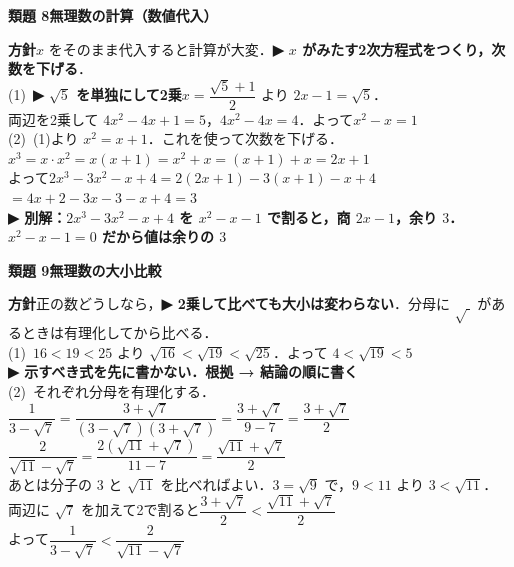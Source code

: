 \documentclass[a4paper,11pt]{ltjsarticle}
\newcommand{\ans}[2]{\Needspace{5\baselineskip}\vspace{6pt}%
  {\sffamily\bfseries 類題 #1\quad #2}\par}
\newcommand{\point}[1]{\textsf{\bfseries ▶ #1}}
\begin{document}
\ans{8}{無理数の計算（数値代入）}
\begin{kai}
\textbf{方針}\quad $x$ をそのまま代入すると計算が大変．\point{$x$ がみたす2次方程式をつくり，次数を下げる}．\\[2pt]
(1)\ \point{$\sqrt5$ を単独にして2乗}\quad $x=\dfrac{\sqrt5+1}{2}$ より $2x-1=\sqrt5$．\\
\hspace*{1.5em}両辺を2乗して $4x^2-4x+1=5$，\quad $4x^2-4x=4$．\quad よって\quad $x^2-x=1$\\[2pt]
(2)\ (1)より $x^2=x+1$．これを使って次数を下げる．\\
\hspace*{1.5em}$x^3=x\cdot x^2=x(x+1)=x^2+x=(x+1)+x=2x+1$\\
\hspace*{1.5em}よって\quad $2x^3-3x^2-x+4=2(2x+1)-3(x+1)-x+4$\\
\hspace*{1.5em}$=4x+2-3x-3-x+4=3$\\
\hspace*{1.5em}\point{別解：$2x^3-3x^2-x+4$ を $x^2-x-1$ で割ると，商 $2x-1$，余り $3$．$x^2-x-1=0$ だから値は余りの $3$}
\end{kai}

\ans{9}{無理数の大小比較}
\begin{kai}
\textbf{方針}\quad 正の数どうしなら，\point{2乗して比べても大小は変わらない}．分母に $\sqrt{\ }$ があるときは有理化してから比べる．\\[2pt]
(1)\ $16<19<25$ より $\sqrt{16}<\sqrt{19}<\sqrt{25}$．\quad よって $4<\sqrt{19}<5$\\
\hspace*{1.5em}\point{示すべき式を先に書かない．根拠 → 結論の順に書く}\\[2pt]
(2)\ それぞれ分母を有理化する．\\
\hspace*{1.5em}$\dfrac{1}{3-\sqrt7}=\dfrac{3+\sqrt7}{(3-\sqrt7)(3+\sqrt7)}=\dfrac{3+\sqrt7}{9-7}=\dfrac{3+\sqrt7}{2}$\\[2pt]
\hspace*{1.5em}$\dfrac{2}{\sqrt{11}-\sqrt7}=\dfrac{2(\sqrt{11}+\sqrt7)}{11-7}=\dfrac{\sqrt{11}+\sqrt7}{2}$\\[2pt]
\hspace*{1.5em}あとは分子の $3$ と $\sqrt{11}$ を比べればよい．$3=\sqrt9$ で，$9<11$ より $3<\sqrt{11}$．\\
\hspace*{1.5em}両辺に $\sqrt7$ を加えて2で割ると\quad $\dfrac{3+\sqrt7}{2}<\dfrac{\sqrt{11}+\sqrt7}{2}$\\[2pt]
\hspace*{1.5em}よって\quad $\dfrac{1}{3-\sqrt7}<\dfrac{2}{\sqrt{11}-\sqrt7}$
\end{kai}
\end{document}
